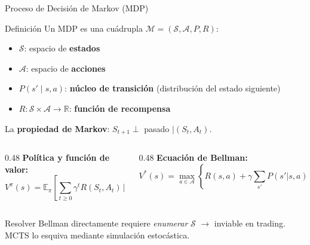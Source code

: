 \documentclass[aspectratio=169, 10pt]{beamer}
\begin{document}
\begin{frame}{Proceso de Decisión de Markov (MDP)}
  \begin{block}{Definición}
    Un MDP es una cuádrupla $\mathcal{M} = (\mathcal{S},\mathcal{A},P,R)$:
    \begin{itemize}
      \item $\mathcal{S}$: espacio de \textbf{estados}
      \item $\mathcal{A}$: espacio de \textbf{acciones}
      \item $P(s'\mid s,a)$: \textbf{núcleo de transición}
        (distribución del estado siguiente)
      \item $R:\mathcal{S}\times\mathcal{A}\to\mathbb{R}$:
        \textbf{función de recompensa}
    \end{itemize}
    La \textbf{propiedad de Markov}: $S_{t+1}\perp$ pasado $\mid (S_t,A_t)$.
  \end{block}

  \begin{columns}[T]
    \begin{column}{0.48\textwidth}
      \textbf{Política y función de valor:}
      \[
        V^\pi(s) = \mathbb{E}_\pi\!\left[
          \sum_{t\geq 0}\gamma^t R(S_t,A_t)\,\Big|\,S_0=s
        \right]
      \]
    \end{column}
    \begin{column}{0.48\textwidth}
      \textbf{Ecuación de Bellman:}
      \[
        V^*(s) = \max_{a\in\mathcal{A}}\!\left\{
          R(s,a) + \gamma\sum_{s'} P(s'|s,a)\,V^*(s')
        \right\}
      \]
    \end{column}
  \end{columns}

  \begin{alertblock}{}
    Resolver Bellman directamente requiere \emph{enumerar} $\mathcal{S}$
    $\to$ inviable en trading. MCTS lo esquiva mediante simulación estocástica.
  \end{alertblock}
\end{frame}
\end{document}
